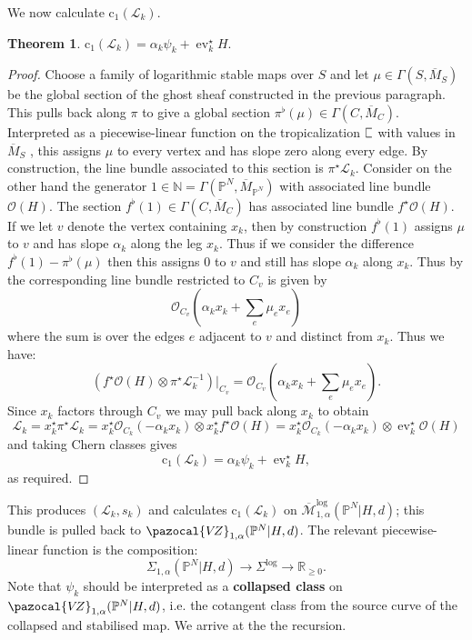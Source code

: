 \documentclass[11pt]{amsart}
\newcommand{\sqC}{\scalebox{0.8}[1.3]{$\sqsubset$}}
\newcommand{\MLog}{\overline{\mathcal{M}}^{\operatorname{log}}}
\newcommand{\PP}{\mathbb P}
\newcommand{\VZ}{\pazocal{V\!Z}}
\newcommand{\st}{\star}
\newcommand{\N}{\mathbb{N}}
\newcommand{\OO}{\mathcal{O}}
\renewcommand{\to}{\rightarrow}
\newcommand{\ev}{\operatorname{ev}}
\newcommand{\Lcal}{\mathcal{L}}
\newcommand{\cchern}{\mathrm{c}}
\newcommand{\ol}[1]{\overline{#1}}
\newcommand{\RR}{\mathbb{R}}
\theoremstyle{definition}
\newtheorem{thm}{Theorem}[section]
\theoremstyle{definition}
\begin{document}
We now calculate $\cchern_1(\Lcal_k)$. 
\begin{thm} $\cchern_1(\Lcal_k) = \alpha_k \psi_k + \ev_k^\st H.$\end{thm}
\begin{proof}
Choose a family of logarithmic stable maps over $S$ and let $\mu \in \Gamma(S,\ol{M}_S)$ be the global section of the ghost sheaf constructed in the previous paragraph. This pulls back along $\pi$ to give a global section $\pi^\flat(\mu) \in \Gamma(C,\ol{M}_C)$.  Interpreted as a piecewise-linear function on the tropicalization $\sqC$ with values in $\ol{M}_S$ \cite[Remark 7.3]{CavalieriChanUlirschWise}, this assigns $\mu$ to every vertex and has slope zero along every edge. By construction, the line bundle associated to this section is $\pi^\st \Lcal_k$. Consider on the other hand the generator $1 \in \N = \Gamma(\PP^N,\ol{M}_{\PP^N})$ with associated line bundle $\OO(H)$. The section $f^\flat(1) \in \Gamma(C,\ol{M}_C)$ has associated line bundle $f^\st\OO(H)$. If we let $v$ denote the vertex containing $x_k$, then by construction $f^\flat(1)$ assigns $\mu$ to $v$ and has slope $\alpha_k$ along the leg $x_k$. Thus if we consider the difference $f^\flat(1) - \pi^\flat(\mu)$ then this assigns $0$ to $v$ and still has slope $\alpha_k$ along $x_k$. Thus by \cite[Proposition 2.4.1]{RSPW} the corresponding line bundle restricted to $C_v$ is given by
\begin{equation*} \OO_{C_v} \left(\alpha_k x_k + \sum_e \mu_e x_e \right) \end{equation*}
where the sum is over the edges $e$ adjacent to $v$ and distinct from $x_k$. Thus we have:
\begin{equation*} \left( f^\st\OO(H) \otimes \pi^\st \Lcal_k^{-1} \right) \big|_{C_v} = \OO_{C_v} \left(\alpha_k x_k + \sum_e \mu_e x_e \right).\end{equation*}
Since $x_k$ factors through $C_v$ we may pull back along $x_k$ to obtain
\begin{equation*} \Lcal_k = x_k^\st\pi^\st \Lcal_k = x_k^\st \OO_{C_k}(-\alpha_k x_k) \otimes x_k^\st f^\st\OO(H) = x_k^\st \OO_{C_k}(-\alpha_k x_k) \otimes \ev_k^\st \OO(H) \end{equation*}
and taking Chern classes gives
\begin{equation*} \cchern_1(\Lcal_k) = \alpha_k \psi_k + \ev_k^\st H,\end{equation*}
as required.\end{proof}
This produces $(\Lcal_k,s_k)$ and calculates $\cchern_1(\Lcal_k)$ on $\MLog_{1,\alpha}(\PP^N|H,d)$; this bundle is pulled back to $\VZ_{1,\alpha}(\PP^N|H,d)$. The relevant piecewise-linear function is the composition:
\begin{equation*} \Sigma_{1,\alpha}(\PP^N|H,d) \to \Sigma^{\log} \to \RR_{\geq 0}.\end{equation*}
Note that $\psi_k$ should be interpreted as a \textbf{collapsed class} on $\VZ_{1,\alpha}(\PP^N|H,d)$, i.e. the cotangent class from the source curve of the collapsed and stabilised map. We arrive at the the recursion. 
\end{document}
